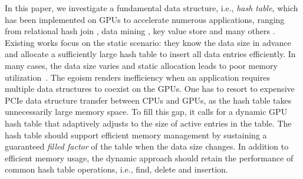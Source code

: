 In this paper, we investigate a fundamental data structure, i.e., \emph{hash table}, which has been implemented on GPUs to accelerate numerous applications, ranging from relational hash join \cite{he2008relational,he2009relational,heimel2013hardware}, data mining \cite{pan2011fast,zhou2010parallel,zhong2014medusa},  key value store \cite{zhang2015mega,hetherington2015memcachedgpu,breslow2016horton} and many others \cite{bowers2010parallel,pan2010efficient,garcia2011coherent,niessner2013real,wu2015gpu}. Existing works \cite{alcantara2009real,zhang2015mega,hong2010mapcg,hetherington2015memcachedgpu,breslow2016horton} focus on the static scenario: they know the data size in advance and allocate a sufficiently large hash table to insert all data entries efficiently. In many cases, the data size varies and static allocation leads to poor memory utilization~\cite{ashkiani2018dynamic}. 
The egoism renders inefficiency when an application requires multiple data structures to coexist on the GPUs. One has to resort to expensive PCIe data structure transfer between CPUs and GPUs, as the hash table takes unnecessarily large memory space. 
To fill this gap, it calls for a dynamic GPU hash table that adaptively adjusts to the size of active entries in the table. The hash table should support efficient memory management by sustaining a guaranteed \emph{filled factor} of the table when the data size changes. 
In addition to efficient memory usage, the dynamic approach should retain the performance of common hash table operations, i.e., find, delete and insertion.


